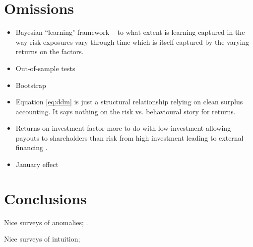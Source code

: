 
\section{Omissions}

\begin{itemize}
  \item Bayesian ``learning" framework \textcite{nagel2013empirical} -- to what extent is
    learning captured in the way risk exposures vary through time which is itself captured
    by the varying returns on the factors.
  \item Out-of-sample tests
  \item Bootstrap
  \item Equation \ref{eq:ddm} is just a structural relationship relying on clean surplus
    accounting. It says nothing on the risk vs. behavioural story for returns.
  \item Returns on investment factor more to do with low-investment allowing payouts to
    shareholders than risk from high investment leading to external financing
    \parencite{fama2008dissecting, daniel2006market, pontiff2008share}.
  \item January effect 
\end{itemize}

\section{Conclusions}

Nice surveys of anomalies;
\textcite{nagel2013empirical, fama2016dissecting}.

Nice surveys of intuition;
\textcite{cochrane2009asset, cochrane2011presidential, nagel2013empirical}

